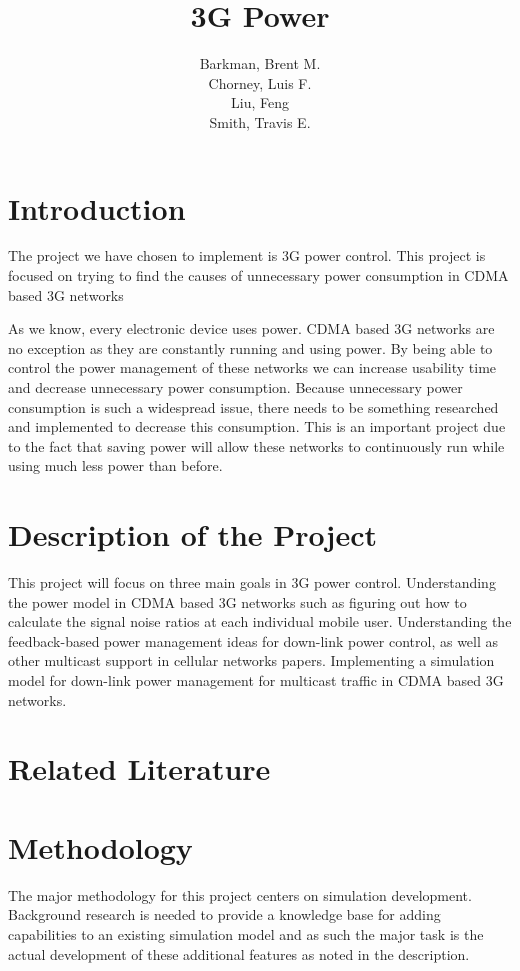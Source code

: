 \documentclass{article}
\title{3G Power}
\author{Barkman, Brent M.\\ Chorney, Luis F.\\ Liu, Feng\\ Smith, Travis E.}
\begin{document}
\maketitle

\section{Introduction}

The project we have chosen to implement is 3G power control. This
project is focused on trying to find the causes of unnecessary power
consumption in CDMA based 3G networks

As we know, every electronic device uses power. CDMA based 3G networks
are no exception as they are constantly running and using power. By
being able to control the power management of these networks we can
increase usability time and decrease unnecessary power consumption.
Because unnecessary power consumption is such a widespread issue,
there needs to be something researched and implemented to decrease
this consumption. This is an important project due to the fact that
saving power will allow these networks to continuously run while
using much less power than before.

\section{Description of the Project}

This project will focus on three main goals in 3G power control.
Understanding the power model in CDMA based 3G networks such as
figuring out how to calculate the signal noise ratios at each
individual mobile user. Understanding the feedback-based power
management ideas for down-link power control, as well as other
multicast support in cellular networks papers. Implementing a
simulation model for down-link power management for multicast traffic
in CDMA based 3G networks.

\section{Related Literature}

\section{Methodology}

The major methodology for this project centers on simulation
development. Background research is needed to provide a knowledge base
for adding capabilities to an existing simulation model and as such
the major task is the actual development of these additional features
as noted in the description.
\end{document}
